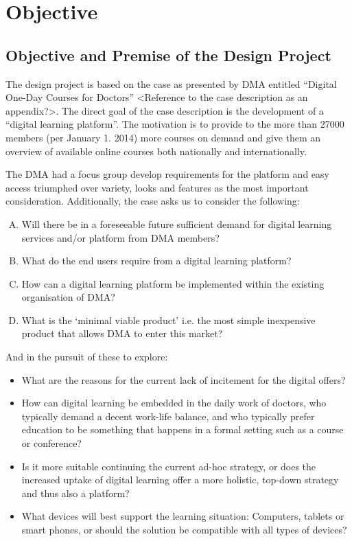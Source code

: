 \section{Objective}
\subsection{Objective and Premise of the Design Project }
The design project is based on the case as presented by DMA entitled “Digital One-Day Courses for Doctors” <Reference to the case description as an appendix?>. The direct goal of the case description is the development of a “digital learning platform”. The motivation is to provide to the more than 27000 members (per January 1. 2014) more courses on demand and give them an overview of available online courses both nationally and internationally.

The DMA had a focus group develop requirements for the platform and easy access triumphed over variety, looks and features as the most important consideration. Additionally, the case asks us to consider the following:

\begin{enumerate}[A.]
\item Will there be in a foreseeable future sufficient demand for digital learning services and/or platform from DMA members?
\item What do the end users require from a digital learning platform?
\item How can a digital learning platform be implemented within the existing organisation of DMA?
\item What is the ‘minimal viable product’ i.e. the most simple inexpensive product that allows DMA to enter this market?
\end{enumerate}

And in the pursuit of these to explore:

\begin{itemize}
\item What are the reasons for the current lack of incitement for the digital offers?
\item How can digital learning  be embedded in the daily work of doctors, who typically demand a decent work-life balance, and who typically prefer education to be something that happens in a formal setting such as a course or conference?
\item Is it more suitable continuing the current ad-hoc strategy, or does the increased uptake of digital learning offer a more holistic, top-down strategy and thus also a platform?
\item What devices will best support the learning situation: Computers, tablets or smart phones, or should the solution be compatible with all types of devices?
\end{itemize}

